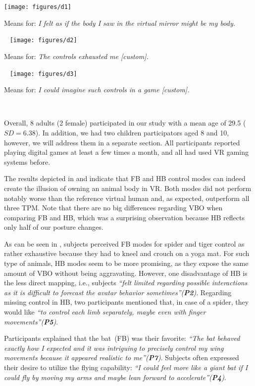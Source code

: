 \documentclass{sigchi-ext}
\begin{document}
\begin{marginfigure}[-22pc]
  \begin{minipage}{\marginparwidth}
    \centering
    \texttt{[image: figures/d1]}
    \caption{Means for: \textit{I felt as if the body I saw in the virtual mirror might be my body.}}~\label{fig:d1}
    \vspace{0.5pc}
        \centering
    \texttt{[image: figures/d2]}
    \caption{Means for: \textit{The controls exhausted me [custom].}}~\label{fig:d2}
        \vspace{0.5pc}
        \centering
    \texttt{[image: figures/d3]}
    \caption{Means for: \textit{I could imagine such controls in a game [custom].}}~\label{fig:d3}
  \end{minipage}
\end{marginfigure}



Overall, 8 adults (2 female) participated in our study with a mean age of 29.5 ($SD=6.38$). In addition, we had two children participators aged 8 and 10, however, we will address them in a separate section. All participants reported playing digital games at least a few times a month, and all had used VR gaming systems before. 

The results depicted in  and  indicate that FB and HB control modes can indeed create the illusion of owning an animal body in VR. Both modes did not perform notably worse than the reference virtual human and, as expected, outperform all three TPM. Note that there are no big differences regarding VBO when comparing FB and HB, which was a surprising observation because HB reflects only half of our posture changes.

As can be seen in , subjects perceived FB modes for spider and tiger control as rather exhaustive because they had to kneel and crouch on a yoga mat. For such type of animals, HB modes seem to be more promising, as they expose the same amount of VBO without being aggravating. However, one disadvantage of HB is the less direct mapping, i.e., subjects \textit{``felt limited regarding possible interactions as it is difficult to forecast the avatar behavior sometimes''(\textbf{P2})}. Regarding missing control in HB, two participants mentioned that, in case of a spider, they would like \textit{``to control each limb separately, maybe even with finger movements''(\textbf{P5})}.

Participants explained that the bat~(FB) was their favorite: \textit{``The bat behaved exactly how I expected and it was intriguing to precisely control my wing movements because it appeared realistic to me''(\textbf{P7})}. Subjects often expressed their desire to utilize the flying capability: \textit{``I could feel more like a giant bat if I could fly by moving my arms and maybe lean forward to accelerate''(\textbf{P4})}.
\end{document}
